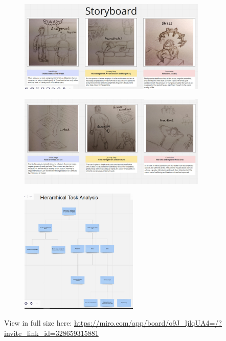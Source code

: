 \documentclass{article}
\begin{document}
	\newpage
		\begin{figure}[h!]
			\centering
			\includegraphics[width=0.8\textwidth]{storyboard1.jpg}
		\end{figure}
		\begin{figure}[h!]
			\centering
			\includegraphics[width=0.8\textwidth]{storyboard2.jpg}
		\end{figure}
		\begin{figure}[h!]
			\centering
			\includegraphics[width=0.5\textwidth]{hta.jpg}
		\end{figure}
		View in full size here: \href{https://miro.com/app/board/o9J_ljlqUA4=/?invite_link_id=328659315881}{https://miro.com/app/board/o9J\_ljlqUA4=/?invite\_link\_id=328659315881}
	\newpage
\end{document}
